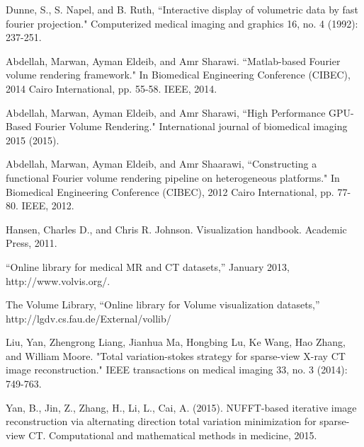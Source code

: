 \documentclass{UCF_ETD}
\begin{document}
\begin{thebibliography}{99}
Dunne, S., S. Napel, and B. Ruth, ``Interactive display of volumetric data by fast fourier projection." Computerized medical imaging and graphics 16, no. 4 (1992): 237-251.

Abdellah, Marwan, Ayman Eldeib, and Amr Sharawi. ``Matlab-based Fourier volume rendering framework." In Biomedical Engineering Conference (CIBEC), 2014 Cairo International, pp. 55-58. IEEE, 2014.

Abdellah, Marwan, Ayman Eldeib, and Amr Sharawi, ``High Performance GPU-Based Fourier Volume Rendering." International journal of biomedical imaging 2015 (2015).

Abdellah, Marwan, Ayman Eldeib, and Amr Shaarawi, ``Constructing a functional Fourier volume rendering pipeline on heterogeneous platforms." In Biomedical Engineering Conference (CIBEC), 2012 Cairo International, pp. 77-80. IEEE, 2012.

Hansen, Charles D., and Chris R. Johnson. Visualization handbook. Academic Press, 2011.


``Online library for medical MR and CT datasets,” January 2013,
http://www.volvis.org/.

The Volume Library, ``Online library for Volume visualization
datasets,” http://lgdv.cs.fau.de/External/vollib/




Liu, Yan, Zhengrong Liang, Jianhua Ma, Hongbing Lu, Ke Wang, Hao Zhang, and William Moore. "Total variation-stokes strategy for sparse-view X-ray CT image reconstruction." IEEE transactions on medical imaging 33, no. 3 (2014): 749-763.

Yan, B., Jin, Z., Zhang, H., Li, L., Cai, A. (2015). NUFFT-based iterative image reconstruction via alternating direction total variation minimization for sparse-view CT. Computational and mathematical methods in medicine, 2015.





\end{thebibliography}
\end{document}
